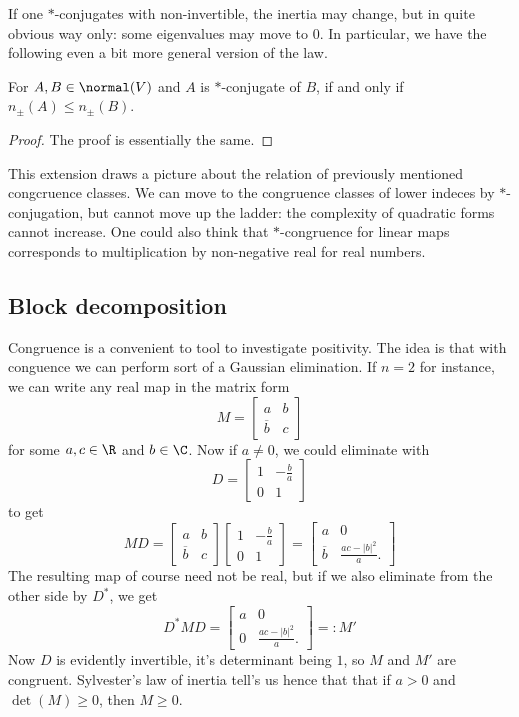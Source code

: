 If one $*$-conjugates with non-invertible, the inertia may change, but in quite obvious way only: some eigenvalues may move to $0$. In particular, we have the following even a bit more general version of the law.

\begin{lause}
	For $A, B \in \normal(V)$ and $A$ is $*$-conjugate of $B$, if and only if $n_{\pm}(A) \leq n_{\pm}(B)$.
\end{lause}
\begin{proof}
	The proof is essentially the same.
\end{proof}

This extension draws a picture about the relation of previously mentioned congcruence classes. We can move to the congruence classes of lower indeces by $*$-conjugation, but cannot move up the ladder: the complexity of quadratic forms cannot increase. One could also think that $*$-congruence for linear maps corresponds to multiplication by non-negative real for real numbers.

\subsection{Block decomposition}

Congruence is a convenient to tool to investigate positivity. The idea is that with conguence we can perform sort of a Gaussian elimination. If $n = 2$ for instance, we can write any real map in the matrix form
\[
	M =
	\begin{bmatrix}
		a & b \\
		\overline{b} & c
	\end{bmatrix}
\]
for some $a, c \in \R$ and $b \in \C$. Now if $a \neq 0$, we could eliminate with
\[
	D =
	\begin{bmatrix}
		1 & -\frac{b}{a} \\
		0 & 1
	\end{bmatrix}
\]
to get
\[
	M D =
	\begin{bmatrix}
		a & b \\
		\overline{b} & c
	\end{bmatrix}
	\begin{bmatrix}
		1 & -\frac{b}{a} \\
		0 & 1
	\end{bmatrix}
	=
	\begin{bmatrix}
		a & 0 \\
		\overline{b} & \frac{a c - |b|^2}{a}.
	\end{bmatrix}
\]
The resulting map of course need not be real, but if we also eliminate from the other side by $D^{*}$, we get
\[
	D^{*} M D =
	\begin{bmatrix}
		a & 0 \\
		0 & \frac{a c - |b|^2}{a}.
	\end{bmatrix}
	=: M'
\]
Now $D$ is evidently invertible, it's determinant being $1$, so $M$ and $M'$ are congruent. Sylvester's law of inertia tell's us hence that that if $a > 0$ and $\det(M) \geq 0$, then $M \geq 0$.

